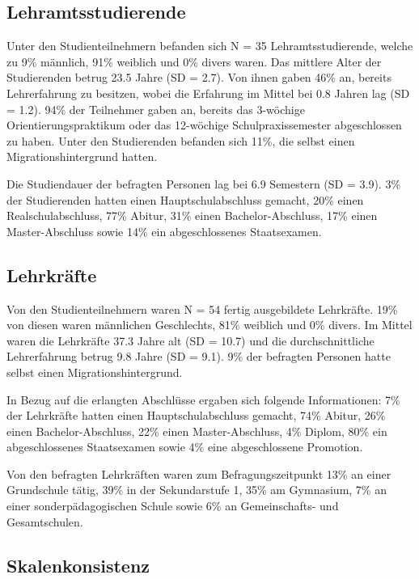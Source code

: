 \subsection{Lehramtsstudierende}
\label{subsec:lehramtsstudierende}

Unter den Studienteilnehmern befanden sich N = 35 Lehramtsstudierende, welche zu 9\% männlich, 91\% weiblich und 0\% divers waren.
Das mittlere Alter der Studierenden betrug 23.5 Jahre (SD = 2.7).
Von ihnen gaben 46\% an, bereits Lehrerfahrung zu besitzen, wobei die Erfahrung im Mittel bei 0.8 Jahren lag (SD = 1.2).
94\% der Teilnehmer gaben an, bereits das 3-wöchige Orientierungspraktikum oder das 12-wöchige Schulpraxissemester abgeschlossen zu haben.
Unter den Studierenden befanden sich 11\%, die selbst einen Migrationshintergrund hatten.

Die Studiendauer der befragten Personen lag bei 6.9 Semestern (SD = 3.9).
3\% der Studierenden hatten einen Hauptschulabschluss gemacht, 20\% einen Realschulabschluss, 77\% Abitur, 31\% einen Bachelor-Abschluss, 17\% einen Master-Abschluss sowie 14\% ein abgeschlossenes Staatsexamen. 

\subsection{Lehrkräfte}
\label{subsec:lehrkräfte}

Von den Studienteilnehmern waren N = 54 fertig ausgebildete Lehrkräfte.
19\% von diesen waren männlichen Geschlechts, 81\% weiblich und 0\% divers.
Im Mittel waren die Lehrkräfte 37.3 Jahre alt (SD = 10.7) und die durchschnittliche Lehrerfahrung betrug 9.8 Jahre (SD = 9.1).
9\% der befragten Personen hatte selbst einen Migrationshintergrund.

In Bezug auf die erlangten Abschlüsse ergaben sich folgende Informationen:
7\% der Lehrkräfte hatten einen Hauptschulabschluss gemacht, 74\% Abitur, 26\% einen Bachelor-Abschluss, 22\% einen Master-Abschluss, 4\% Diplom, 80\% ein abgeschlossenes Staatsexamen sowie 4\% eine abgeschlossene Promotion.

Von den befragten Lehrkräften waren zum Befragungszeitpunkt 13\% an einer Grundschule tätig, 39\% in der Sekundarstufe 1, 35\% am Gymnasium, 7\% an einer sonderpädagogischen Schule sowie 6\% an Gemeinschafts- und Gesamtschulen.

\subsection{Skalenkonsistenz}
\label{subsec:skalenkonsistenz}

